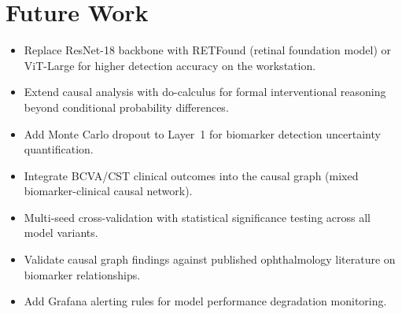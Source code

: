 \documentclass[12pt,a4paper]{article}
\begin{document}
\section{Future Work}

\begin{itemize}[nosep]
  \item Replace ResNet-18 backbone with RETFound (retinal foundation model) or ViT-Large for higher detection accuracy on the workstation.
  \item Extend causal analysis with do-calculus for formal interventional reasoning beyond conditional probability differences.
  \item Add Monte Carlo dropout to Layer~1 for biomarker detection uncertainty quantification.
  \item Integrate BCVA/CST clinical outcomes into the causal graph (mixed biomarker-clinical causal network).
  \item Multi-seed cross-validation with statistical significance testing across all model variants.
  \item Validate causal graph findings against published ophthalmology literature on biomarker relationships.
  \item Add Grafana alerting rules for model performance degradation monitoring.
\end{itemize}
\end{document}
